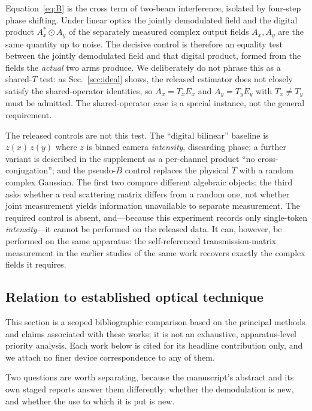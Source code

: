 \documentclass[11pt,a4paper]{article}
\begin{document}
Equation~\eqref{eq:B} is the cross term of two-beam interference, isolated by
four-step phase shifting. Under linear optics the jointly demodulated field
and the digital product $A_x^{\ast}\!\odot A_y$ of the separately measured
complex output fields $A_x, A_y$ are the same quantity up to noise. The
decisive control is therefore an equality test between the jointly demodulated
field and that digital product, formed from the fields the \emph{actual} two
arms produce. We deliberately do not phrase this as a shared-$T$ test: as
Sec.~\ref{sec:ideal} shows, the released estimator does not closely satisfy
the shared-operator identities, so $A_x=T_xE_x$ and $A_y=T_yE_y$ with
$T_x\neq T_y$ must be admitted. The shared-operator case is a special
instance, not the general requirement.

The released controls are not this test. The ``digital bilinear'' baseline is
$z(x)\,z(y)$ where $z$ is binned camera \emph{intensity}, discarding phase;
a further variant is described in the supplement as a per-channel product
``no cross-conjugation''; and the pseudo-$B$ control replaces the physical $T$
with a random complex Gaussian. The first two compare different algebraic
objects; the third asks whether a real scattering matrix differs from a random
one, not whether joint measurement yields information unavailable to separate
measurement. The required control is absent, and---because this experiment
records only single-token \emph{intensity}---it cannot be performed on the
released data. It can, however, be performed on the same apparatus: the
self-referenced transmission-matrix measurement in the earlier studies of the
same work recovers exactly the complex fields it requires.

\subsection{Relation to established optical technique}
\label{sec:priorart}

This section is a scoped bibliographic comparison based on the principal
methods and claims associated with these works; it is not an exhaustive,
apparatus-level priority analysis. Each work below is cited for its headline
contribution only, and we attach no finer device correspondence to any of
them.

Two questions are worth separating, because the manuscript's abstract and its
own staged reports answer them differently: whether the demodulation is new,
and whether the use to which it is put is new.
\end{document}
